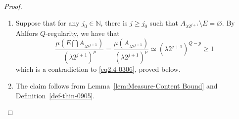 \documentclass[10pt]{amsart}
\numberwithin{equation}{section}
\begin{document}
	 \begin{proof} 
	 \begin{enumerate}[label=\arabic*.]
		\item Suppose that for any $j_0\in\mathbb N$, there is $j\geq j_0$ such that $A_{\lambda 2^{j+1}}\setminus E=\varnothing$.  By Ahlfors $Q$-regularity, we have that 
			\[
			 \frac{\mu(E\bigcap A_{\lambda 2^{j+1}})}{(\lambda 2^{j+1})^p} = \frac{\mu(A_{\lambda 2^{j+1}})}{(\lambda 2^{j+1})^p}\simeq (\lambda 2^{j+1})^{Q-p}\ge1
			\] 
		 which is a contradiction to \eqref{eq2.4-0306}, proved below.
   
        \item The claim follows from Lemma~\ref{lem:Measure-Content Bound} and Definition~\ref{def-thin-0905}. 
		

\end{enumerate}
\end{proof}
\end{document}
